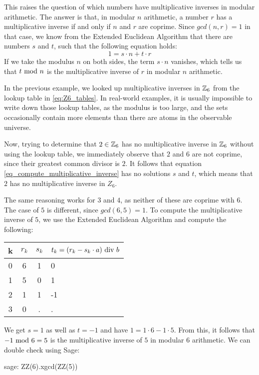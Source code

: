 This raises the question of which numbers have multiplicative inverses in modular arithmetic. The answer is that, in modular $n$ arithmetic, a number $r$ has a multiplicative inverse if and only if $n$ and $r$ are coprime. Since $gcd(n,r)=1$ in that case, we know from the Extended Euclidean Algorithm that there are numbers $s$ and $t$, such that the following equation holds:
\begin{equation}
\label{eq_compute_multiplicative_inverse}
1 = s\cdot n + t\cdot r
\end{equation}
If we take the modulus $n$ on both sides, the term $s\cdot n$ vanishes, which tells us that $t \text{ mod } n$ is the multiplicative inverse of $r$ in modular $n$ arithmetic.
\begin{example} In the previous example, we looked up multiplicative inverses in $\mathbb{Z}_6$ from the lookup table in \eqref{eq:Z6_tables}. In real-world examples, it is  usually impossible to write down those lookup tables, as the modulus is too large, and the sets occasionally contain more elements than there are atoms in the observable universe.

Now, trying to determine that $2\in \mathbb{Z}_6$ has no multiplicative inverse in $\mathbb{Z}_6$ without using the lookup table, we immediately observe that $2$ and $6$ are not coprime, since their greatest common divisor is $2$. It follows that equation \ref{eq_compute_multiplicative_inverse} has no solutions $s$ and $t$, which means that $2$ has no multiplicative inverse in $Z_6$.

The same reasoning works for $3$ and $4$, as neither of these are coprime with $6$. The case of  $5$ is different, since $gcd(6,5)=1$. To compute the multiplicative inverse of $5$, we use the Extended Euclidean Algorithm and compute  the following:
\begin{center}
  \begin{tabular}{c | c c l}
    k & $ r_k $ & $ s_k $ & $ t_k = (r_k-s_k \cdot a) \text{ div } b $ \\\hline
    0 & 6 & 1 & 0 \\
    1 & 5 & 0 & 1 \\
    2 & 1 & 1 & -1 \\
    3 & 0 & . & . \\
  \end{tabular}
\end{center}

We get $s=1$ as well as $t=-1$ and have $1 = 1\cdot 6 -1\cdot 5$. From this, it follows that $-1 \text{ mod } 6=5$ is the multiplicative inverse of $5$ in modular $6$ arithmetic. We can double check using  Sage:
\begin{sagecommandline}
sage: ZZ(6).xgcd(ZZ(5))
\end{sagecommandline}
\end{example}
